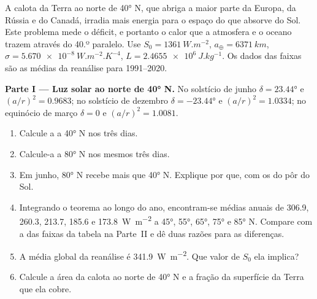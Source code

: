 \begin{problem}
\label{pb:b1:radiation-heat-transport:1}
A calota da Terra ao norte de \ang{40} N, que abriga a maior parte da Europa, da Rússia e do
Canadá, irradia mais energia para o espaço do que absorve do Sol. Este problema mede o déficit, e
portanto o calor que a atmosfera e o oceano trazem através do 40.º paralelo. Use $S_0 = \qty{1361}{W.m^{-2}}$, $a_\oplus = \qty{6371}{km}$, $\sigma = \qty{5.670e-8}{W.m^{-2}.K^{-4}}$, $L =
\qty{2.4655e6}{J.kg^{-1}}$. Os dados das faixas são as médias da reanálise para 1991--2020.

\medskip
\noindent\textbf{Parte I --- Luz solar ao norte de \ang{40} N.} No solstício de junho
$\delta = \ang{23.44}$ e $(a/r)^2 = 0.9683$; no solstício de dezembro $\delta =
\ang{-23.44}$ e $(a/r)^2 = 1.0334$; no equinócio de março $\delta = 0$ e
$(a/r)^2 = 1.0081$.
\begin{enumerate}
  \item Calcule a  a \ang{40} N nos três dias.
  \item Calcule-a a \ang{80} N nos mesmos três dias.
  \item Em junho, \ang{80} N recebe mais que \ang{40} N. Explique por que, com os 
        do pôr do Sol.
  \item Integrando o teorema ao longo do ano, encontram-se médias anuais de \qty{306.9}{},
        \qty{260.3}{}, \qty{213.7}{}, \qty{185.6}{} e \qty{173.8}{W.m^{-2}} a \ang{45}, \ang{55},
        \ang{65}, \ang{75} e \ang{85} N. Compare com a  das faixas da tabela na Parte~II e
        dê duas razões para as diferenças.
  \item A  média global da reanálise é \qty{341.9}{W.m^{-2}}. Que valor de $S_0$ ela
        implica?
  \item Calcule a área da calota ao norte de \ang{40} N e a fração da superfície da Terra que ela
        cobre.
\end{enumerate}


\end{problem}
